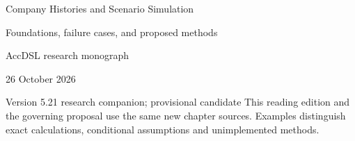 \documentclass[11pt,a4paper]{report}
\begin{document}
\hypersetup{pageanchor=false}
\begin{titlepage}
{\Huge Company Histories and Scenario Simulation\par}
\vspace{12mm}
{\Large Foundations, failure cases, and proposed methods\par}
\vspace{8mm}
AccDSL research monograph\par 26 October 2026\par Version 5.21 research companion; provisional candidate
\vfill
This reading edition and the governing proposal use the same new chapter sources. Examples distinguish exact calculations, conditional assumptions and unimplemented methods.
\end{titlepage}
\hypersetup{pageanchor=true}
\tableofcontents
\clearpage{}


























\clearpage\label{sim:body-end}

\begingroup\raggedright
\endgroup
\end{document}
